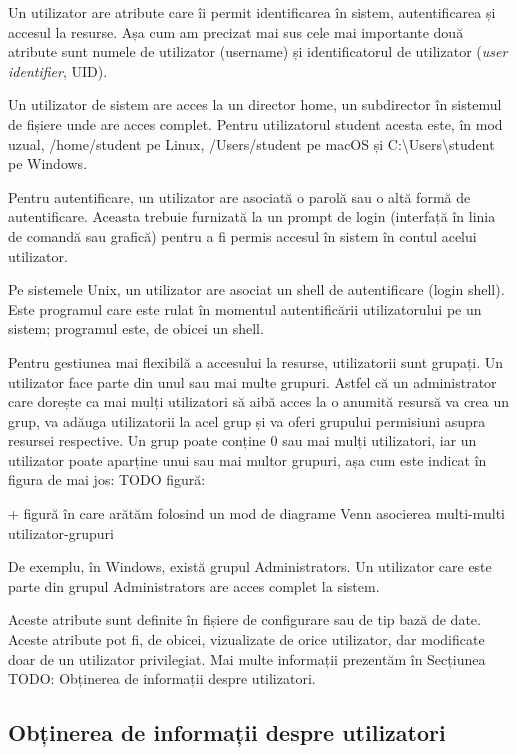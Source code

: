 Un utilizator are atribute care îi permit identificarea în sistem,
autentificarea și accesul la resurse. Așa cum am precizat mai sus cele mai
importante două atribute sunt numele de utilizator (username) și identificatorul
de utilizator (\textit{user identifier}, UID).

Un utilizator de sistem are acces la un director home, un subdirector în
sistemul de fișiere unde are acces complet. Pentru utilizatorul student acesta
este, în mod uzual, /home/student pe Linux, /Users/student pe macOS și
C:\textbackslash{}Users\textbackslash{}student pe Windows.

Pentru autentificare, un utilizator are asociată o parolă sau o altă formă de
autentificare. Aceasta trebuie furnizată la un prompt de login (interfață în
linia de comandă sau grafică) pentru a fi permis accesul în sistem în contul
acelui utilizator.

Pe sistemele Unix, un utilizator are asociat un shell de autentificare (login
shell). Este programul care este rulat în momentul autentificării utilizatorului
pe un sistem; programul este, de obicei un shell.

Pentru gestiunea mai flexibilă a accesului la resurse, utilizatorii sunt
grupați. Un utilizator face parte din unul sau mai multe grupuri. Astfel că un
administrator care dorește ca mai mulți utilizatori să aibă acces la o anumită
resursă va crea un grup, va adăuga utilizatorii la acel grup și va oferi
grupului permisiuni asupra resursei respective. Un grup poate conține 0 sau mai
mulți utilizatori, iar un utilizator poate aparține unui sau mai multor grupuri,
așa cum este indicat în figura de mai jos: TODO figură:

+ figură în care arătăm folosind un mod de diagrame Venn asocierea multi-multi utilizator-grupuri

De exemplu, în Windows, există grupul Administrators. Un utilizator care este
parte din grupul Administrators are acces complet la sistem.

Aceste atribute sunt definite în fișiere de configurare sau de tip bază de date.
Aceste atribute pot fi, de obicei, vizualizate de orice utilizator, dar
modificate doar de un utilizator privilegiat. Mai multe informații prezentăm în
Secțiunea TODO: Obținerea de informații despre utilizatori.

\subsection{Obținerea de informații despre utilizatori}
\label{sec:users-ops-info}

